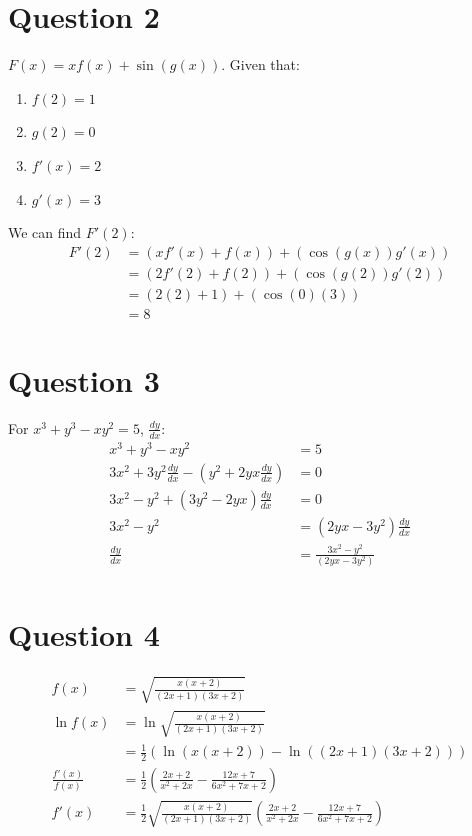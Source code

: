 \documentclass{article}
\begin{document}
\section*{Question 2}
$F(x)=xf(x)+\sin(g(x))$. Given that:
\begin{enumerate}
    \item $f(2) = 1$
    \item $g(2) = 0$
    \item $f'(x) = 2$
    \item $g'(x) = 3$
\end{enumerate}
We can find $F'(2)$:
\begin{align*}
    F'(2) & = (xf'(x) + f(x)) + (\cos(g(x))g'(x)) \\
          & = (2f'(2) + f(2)) + (\cos(g(2))g'(2)) \\
          & = (2(2) + 1) + (\cos(0)(3))           \\
          & = 8
\end{align*}

\section*{Question 3}
For $x^3+y^3-xy^2=5$, $\frac{dy}{dx}$:
\begin{align*}
    x^3+y^3-xy^2                                  & =5                            \\
    3x^2+3y^2\frac{dy}{dx}-(y^2+2yx\frac{dy}{dx}) & =0                            \\
    3x^2-y^2+(3y^2-2yx)\frac{dy}{dx}              & =0                            \\
    3x^2-y^2                                      & =(2yx-3y^2)\frac{dy}{dx}      \\
    \frac{dy}{dx}                                 & =\frac{3x^2-y^2 }{(2yx-3y^2)} \\
\end{align*}

\section*{Question 4}
\begin{align*}
    f(x)               & =\sqrt{\frac{x(x+2)}{(2x+1)(3x+2)}}                                                          \\
    \ln f(x)           & =\ln\sqrt{\frac{x(x+2)}{(2x+1)(3x+2)}}                                                       \\
                       & = \frac{1}{2}(\ln(x(x+2))-\ln((2x+1)(3x+2)))                                                 \\
    \frac{f'(x)}{f(x)} & = \frac{1}{2}(\frac{2x+2}{x^2+2x}-\frac{12x+7}{6x^2+7x+2})                                   \\
    f'(x)              & = \frac{1}{2}\sqrt{\frac{x(x+2)}{(2x+1)(3x+2)}}(\frac{2x+2}{x^2+2x}-\frac{12x+7}{6x^2+7x+2})
\end{align*}
\end{document}
